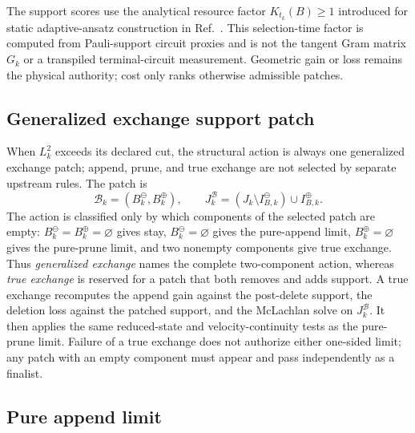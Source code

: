 \documentclass[
  reprint,
  amsmath,
  amssymb,
  aps,
  pra,
  nofootinbib,
  superscriptaddress,
  floatfix
]{revtex4-2}
\begin{document}
The support scores use the analytical resource factor \(K_{t_k}(B)\ge1\) introduced for static adaptive-ansatz construction in Ref.~\cite{Strobel2026StaticAdapt}.  This selection-time factor is computed from Pauli-support circuit proxies and is not the tangent Gram matrix \(G_k\) or a transpiled terminal-circuit measurement.  Geometric gain or loss remains the physical authority; cost only ranks otherwise admissible patches.

\subsection{Generalized exchange support patch}

When $L_k^2$ exceeds its declared cut, the structural action is always one generalized exchange patch; append, prune, and true exchange are not selected by separate upstream rules.  The patch is
\begin{equation}
\mathcal B_k=(B_k^{\ominus},B_k^{\oplus}),
\qquad
J_k^{\mathcal B}
=
(J_k\setminus I_{B,k}^{\ominus})
\cup I_{B,k}^{\oplus}.
\label{eq:support_patch}
\end{equation}
The action is classified only by which components of the selected patch are empty: $B_k^{\ominus}=B_k^{\oplus}=\varnothing$ gives stay, $B_k^{\ominus}=\varnothing$ gives the pure-append limit, $B_k^{\oplus}=\varnothing$ gives the pure-prune limit, and two nonempty components give true exchange.  Thus \emph{generalized exchange} names the complete two-component action, whereas \emph{true exchange} is reserved for a patch that both removes and adds support.  A true exchange recomputes the append gain against the post-delete support, the deletion loss against the patched support, and the McLachlan solve on \(J_k^{\mathcal B}\).  It then applies the same reduced-state and velocity-continuity tests as the pure-prune limit.  Failure of a true exchange does not authorize either one-sided limit; any patch with an empty component must appear and pass independently as a finalist.

\subsection{Pure append limit}
\end{document}

